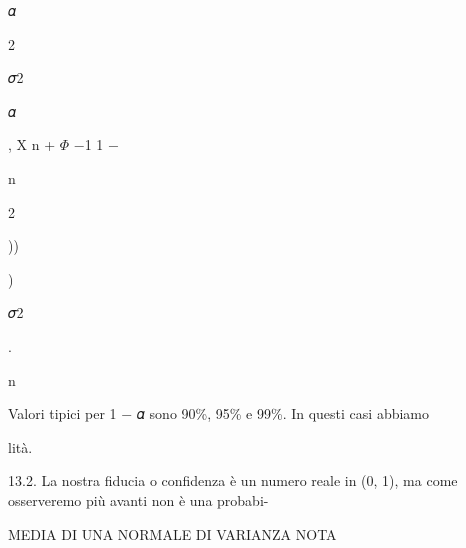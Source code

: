 \documentclass[a4paper,portrait,12pt]{article}
\begin{document}
\begin{flushleft}
𝛼
\end{flushleft}


2





\begin{flushleft}
𝜎2
\end{flushleft}


\begin{flushleft}
𝛼
\end{flushleft}


\begin{flushleft}
, X n + $\Phi$ $-$1 1 $-$
\end{flushleft}


\begin{flushleft}
n
\end{flushleft}


2





))


)





\begin{flushleft}
𝜎2
\end{flushleft}


.


\begin{flushleft}
n
\end{flushleft}





\begin{flushleft}
Valori tipici per 1 $-$ 𝛼 sono 90\%, 95\% e 99\%. In questi casi abbiamo
\end{flushleft}


\begin{flushleft}
lit\`{a}.
\end{flushleft}





\begin{flushleft}
13.2. La nostra fiducia o confidenza \`{e} un numero reale in (0, 1), ma come osserveremo più avanti non \`{e} una probabi-
\end{flushleft}





\begin{flushleft}
 MEDIA DI UNA NORMALE DI VARIANZA NOTA
\end{flushleft}
\end{document}
